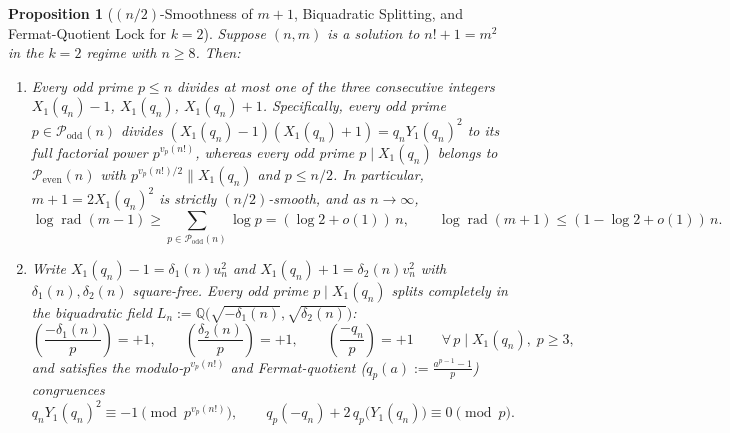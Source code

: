 \documentclass[11pt,reqno]{amsart}
\newtheorem{proposition}[theorem]{Proposition}
\theoremstyle{remark}
\numberwithin{equation}{section}
\newcommand{\Q}{\mathbb{Q}}
\newcommand{\Podd}{\mathcal{P}_{\mathrm{odd}}}
\newcommand{\Peven}{\mathcal{P}_{\mathrm{even}}}
\DeclareMathOperator{\rad}{rad}
\begin{document}
\begin{proposition}[{$(n/2)$-Smoothness of $m + 1$, Biquadratic Splitting, and Fermat-Quotient Lock for $k = 2$}]\label{prop:4.1}
Suppose $(n, m)$ is a solution to $n! + 1 = m^2$ in the $k = 2$ regime with $n \ge 8$. Then:
\begin{enumerate}
\item[(i)] Every odd prime $p \le n$ divides at most one of the three consecutive integers $X_1(q_n) - 1$, $X_1(q_n)$, $X_1(q_n) + 1$. Specifically, every odd prime $p \in \Podd(n)$ divides $(X_1(q_n) - 1)(X_1(q_n) + 1) = q_n Y_1(q_n)^2$ to its full factorial power $p^{v_p(n!)}$, whereas every odd prime $p \mid X_1(q_n)$ belongs to $\Peven(n)$ with $p^{v_p(n!)/2} \parallel X_1(q_n)$ and $p \le n/2$. In particular, $m + 1 = 2X_1(q_n)^2$ is strictly $(n/2)$-smooth, and as $n \to \infty$,
\begin{equation}\label{eq:4.4}
\log \rad(m - 1) \ge \sum_{p \in \Podd(n)} \log p = (\log 2 + o(1))\,n, \qquad \log \rad(m + 1) \le (1 - \log 2 + o(1))\,n.
\end{equation}
\item[(ii)] Write $X_1(q_n) - 1 = \delta_1(n)u_n^2$ and $X_1(q_n) + 1 = \delta_2(n)v_n^2$ with $\delta_1(n), \delta_2(n)$ square-free. Every odd prime $p \mid X_1(q_n)$ splits completely in the biquadratic field $L_n := \Q\bigl(\sqrt{-\delta_1(n)}, \sqrt{\delta_2(n)}\bigr)$:
\begin{equation}\label{eq:4.5}
\left(\frac{-\delta_1(n)}{p}\right) = +1, \qquad \left(\frac{\delta_2(n)}{p}\right) = +1, \qquad \left(\frac{-q_n}{p}\right) = +1 \qquad \forall\, p \mid X_1(q_n),\; p \ge 3,
\end{equation}
and satisfies the modulo-$p^{v_p(n!)}$ and Fermat-quotient ($q_p(a) := \frac{a^{p-1} - 1}{p}$) congruences
\begin{equation}\label{eq:4.6}
q_n Y_1(q_n)^2 \equiv -1 \pmod{p^{v_p(n!)}}, \qquad q_p(-q_n) + 2\,q_p\bigl(Y_1(q_n)\bigr) \equiv 0 \pmod p.
\end{equation}
\end{enumerate}
\end{proposition}
\end{document}

